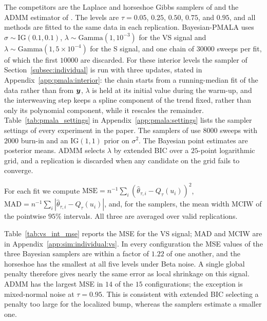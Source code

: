 The competitors are the Laplace and horseshoe Gibbs samplers of \citet{onizuka2024fast} and the ADMM estimator of \citet{brantley2020baseline}. The levels are $\tau=0.05$, $0.25$, $0.50$, $0.75$, and $0.95$, and all methods are fitted to the same data in each replication. Bayesian-PMALA uses $\sigma\sim\mathrm{IG}(0.1,0.1)$, $\lambda\sim\mathrm{Gamma}(1,10^{-3})$ for the VS signal and $\lambda\sim\mathrm{Gamma}(1,5\times10^{-4})$ for the S signal, and one chain of $30000$ sweeps per fit, of which the first $10000$ are discarded. For these interior levels the sampler of Section~\ref{subsec:individual} is run with three updates, stated in Appendix~\ref{app:pmala:interior}: the chain starts from a running-median fit of the data rather than from $\bm{y}$, $\lambda$ is held at its initial value during the warm-up, and the interweaving step keeps a spline component of the trend fixed, rather than only its polynomial component, while it rescales the remainder. Table~\ref{tab:pmala_settings} in Appendix~\ref{app:pmala:settings} lists the sampler settings of every experiment in the paper. The samplers of \citet{onizuka2024fast} use $8000$ sweeps with $2000$ burn-in and an $\mathrm{IG}(1,1)$ prior on $\sigma^2$. The Bayesian point estimates are posterior means. ADMM selects $\lambda$ by extended BIC over a $25$-point logarithmic grid, and a replication is discarded when any candidate on the grid fails to converge.

For each fit we compute $\mathrm{MSE}=n^{-1}\sum_i(\widehat\theta_{\tau,i}-Q_\tau(u_i))^2$, $\mathrm{MAD}=n^{-1}\sum_i|\widehat\theta_{\tau,i}-Q_\tau(u_i)|$, and, for the samplers, the mean width MCIW of the pointwise $95\%$ intervals. All three are averaged over valid replications.

Table~\ref{tab:vs_int_mse} reports the MSE for the VS signal; MAD and MCIW are in Appendix~\ref{app:sim:individual:vs}. In every configuration the MSE values of the three Bayesian samplers are within a factor of $1.22$ of one another, and the horseshoe has the smallest at all five levels under Beta noise. A single global penalty therefore gives nearly the same error as local shrinkage on this signal. ADMM has the largest MSE in $14$ of the $15$ configurations; the exception is mixed-normal noise at $\tau=0.95$. This is consistent with extended BIC selecting a penalty too large for the localized bump, whereas the samplers estimate a smaller one.

